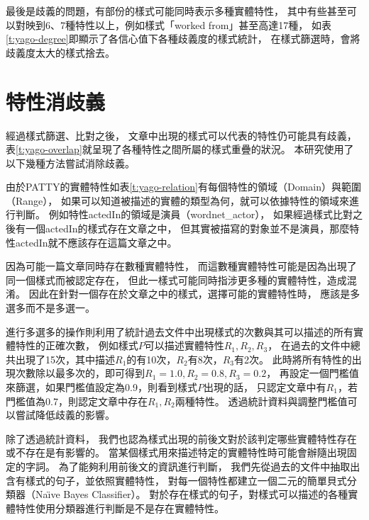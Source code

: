 最後是歧義的問題，有部份的樣式可能同時表示多種實體特性，
其中有些甚至可以對映到6、7種特性以上，例如樣式「worked from」甚至高達17種，
如表\ref{t:yago-degree}即顯示了各信心值下各種歧義度的樣式統計，
在樣式篩選時，會將歧義度太大的樣式捨去。



\section{特性消歧義}
\label{s:pattern-disambiguity}

經過樣式篩選、比對之後，
文章中出現的樣式可以代表的特性仍可能具有歧義，
表\ref{t:yago-overlap}就呈現了各種特性之間所屬的樣式重疊的狀況。
本研究使用了以下幾種方法嘗試消除歧義。


由於PATTY的實體特性如表\ref{t:yago-relation}有每個特性的領域（Domain）與範圍（Range），
如果可以知道被描述的實體的類型為何，就可以依據特性的領域來進行判斷。
例如特性actedIn的領域是演員（wordnet\_actor），
如果經過樣式比對之後有一個actedIn的樣式存在文章之中，
但其實被描寫的對象並不是演員，那麼特性actedIn就不應該存在這篇文章之中。

因為可能一篇文章同時存在數種實體特性，
而這數種實體特性可能是因為出現了同一個樣式而被認定存在，
但此一樣式可能同時指涉更多種的實體特性，造成混淆。
因此在針對一個存在於文章之中的樣式，選擇可能的實體特性時，
應該是多選多而不是多選一。

進行多選多的操作則利用了統計過去文件中出現樣式的次數與其可以描述的所有實體特性的正確次數，
例如樣式$P$可以描述實體特性$R_1, R_2, R_3$，
在過去的文件中總共出現了15次，其中描述$R_1$的有10次，$R_2$有8次，$R_3$有2次。
此時將所有特性的出現次數除以最多次的，即可得到$R_1=1.0, R_2=0.8, R_3 = 0.2$，
再設定一個門檻值來篩選，如果門檻值設定為0.9，則看到樣式$P$出現的話，
只認定文章中有$R_1$，若門檻值為0.7，則認定文章中存在$R_1,R_2$兩種特性。
透過統計資料與調整門檻值可以嘗試降低歧義的影響。

除了透過統計資料，
我們也認為樣式出現的前後文對於該判定哪些實體特性存在或不存在是有影響的。
當某個樣式用來描述特定的實體特性時可能會辦隨出現固定的字詞。
為了能夠利用前後文的資訊進行判斷，
我們先從過去的文件中抽取出含有樣式的句子，並依照實體特性，
對每一個特性都建立一個二元的簡單貝式分類器（Na\"{\i}ve Bayes Classifier）。
對於存在樣式的句子，對樣式可以描述的各種實體特性使用分類器進行判斷是不是存在實體特性。

